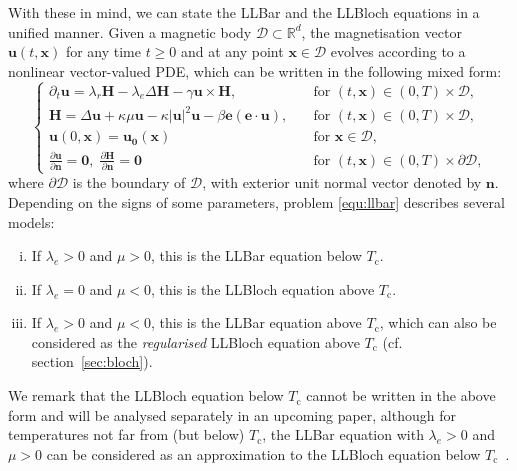 \documentclass[11pt, reqno]{amsart}
\theoremstyle{definition}
\theoremstyle{remark}
\numberwithin{equation}{section}
\newcommand{\bff}{\boldsymbol}
\newcommand{\bb}{\mathbb}
\begin{document}
With these in mind, we can state the LLBar and the LLBloch equations in a unified manner. Given a magnetic body $\mathscr{D}\subset \bb{R}^d$, the magnetisation vector $\bff{u}(t,\bff{x})$ for any time $t\geq 0$ and at any point $\bff{x}\in \mathscr{D}$ evolves according to a nonlinear vector-valued PDE, which can be written in the following mixed form:
\begin{equation}\label{equ:llbar}
	\begin{cases}
		\displaystyle 
		\partial_t \bff{u}
		= 
		\lambda_r \bff{H} 
		- \lambda_e \Delta \bff{H} 
		- \gamma \bff{u} \times \bff{H},
		\quad & \text{for $(t,\bff{x})\in(0,T)\times\mathscr{D}$,}
		\\[1mm]
		\bff{H}
		= 
		\Delta \bff{u} 
		+ \kappa \mu \bff{u}
		- \kappa |\bff{u}|^2 \bff{u}
		- \beta \bff{e}(\bff{e}\cdot \bff{u}),
		\quad & \text{for $(t,\bff{x})\in(0,T)\times\mathscr{D}$,}
		\\[1mm]
		\bff{u}(0,\bff{x})= \bff{u_0}(\bff{x}) 
		\quad & \text{for } \bff{x}\in \mathscr{D},
		\\[1mm]
		\displaystyle{
			\frac{\partial \bff{u}}{\partial \bff{n}}= \bff{0}}, 
		\;\displaystyle{\frac{\partial \bff{H}}{\partial \bff{n}}= \bff{0}} 
		\quad & \text{for } (t,\bff{x})\in (0,T) \times \partial \mathscr{D},
	\end{cases}
\end{equation}
where $\partial\mathscr{D}$ is the boundary of $\mathscr{D}$, with exterior unit normal vector denoted by $\bff{n}$. Depending on the signs of some parameters, problem \eqref{equ:llbar} describes several models:
\begin{enumerate}[(i)]
	\item If $\lambda_e>0$ and $\mu>0$, this is the LLBar equation below $T_\mathrm{c}$.
	\item If $\lambda_e=0$ and $\mu<0$, this is the LLBloch equation above $T_\mathrm{c}$.
	\item If $\lambda_e>0$ and $\mu<0$, this is the LLBar equation above $T_\mathrm{c}$, which can also be considered as the \emph{regularised} LLBloch equation above $T_\mathrm{c}$ (cf. section~\ref{sec:bloch}).
\end{enumerate}
We remark that the LLBloch equation below $T_\mathrm{c}$ cannot be written in the above form and will be analysed separately in an upcoming paper, although for temperatures not far from (but below) $T_\mathrm{c}$, the LLBar equation with $\lambda_e>0$ and $\mu>0$ can be considered as an approximation to the LLBloch equation below $T_\mathrm{c}$~\cite{WanDvo15}.
\end{document}
